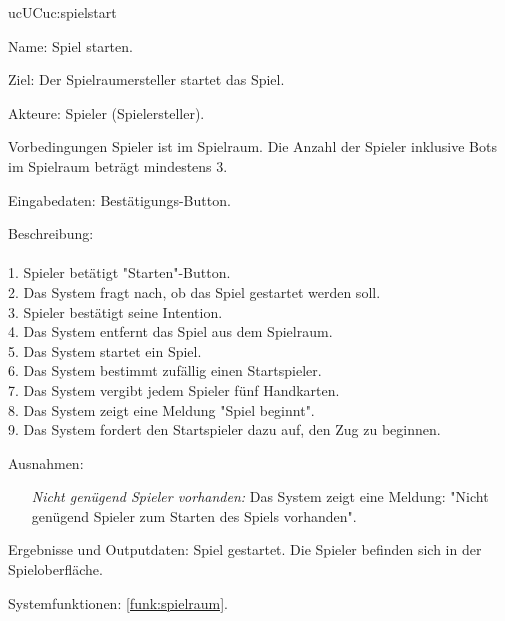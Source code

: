 \begin{description}[leftmargin=5em, style=sameline]
	\begin{lhp}{uc}{UC}{uc:spielstart}
		\item [Name:] Spiel starten.
		\item [Ziel:] Der Spielraumersteller startet das Spiel.
		\item [Akteure:] Spieler (Spielersteller).
		\item [Vorbedingungen] Spieler ist im Spielraum. Die Anzahl der Spieler inklusive Bots im Spielraum beträgt mindestens 3.
		\item [Eingabedaten:] Bestätigungs-Button.
		\item [Beschreibung:] \hfill\\ \hfill\\
			1. Spieler betätigt "{}Starten{}"{}-Button.\\
			2. Das System fragt nach, ob das Spiel gestartet werden soll.\\
			3. Spieler bestätigt seine Intention.\\
			4. Das System entfernt das Spiel aus dem Spielraum.\\
			5. Das System startet ein Spiel.\\	
			6. Das System bestimmt zufällig einen Startspieler.\\	
			7. Das System vergibt jedem Spieler fünf Handkarten.\\
			8. Das System zeigt eine Meldung {}"Spiel beginnt{}"{}.\\
			9. Das System fordert den Startspieler dazu auf, den Zug zu beginnen.\\
		\item [Ausnahmen:] \hfill
			\begin{itemize} 
					\item[] \textit{Nicht genügend Spieler vorhanden:} Das System zeigt eine Meldung: "{}Nicht genügend Spieler zum Starten des Spiels vorhanden{}"{}.
					
			\end{itemize}
		\item [Ergebnisse und Outputdaten:] Spiel gestartet. Die Spieler befinden sich in der Spieloberfläche.	
		\item [Systemfunktionen:] \ref{funk:spielraum}.
	\end{lhp}


\end{description}

